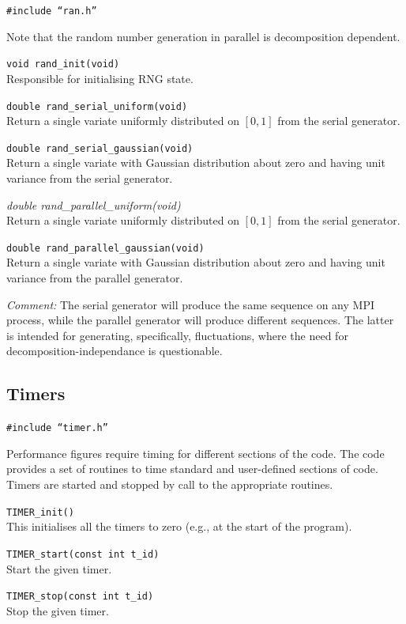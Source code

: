 \texttt{\#include ``ran.h''}

Note that the random number generation in parallel is
decomposition dependent.

\texttt{void rand\_init(void)}\\
Responsible for initialising RNG state.

\texttt{double rand\_serial\_uniform(void)}\\
Return a single variate uniformly distributed on $[0,1]$ from
the serial generator.

\texttt{double rand\_serial\_gaussian(void)}\\
Return a single variate with Gaussian distribution about zero
and having unit variance from the serial generator.

\textit{double rand\_parallel\_uniform(void)}\\
Return a single variate uniformly distributed on $[0,1]$
from the serial generator.

\texttt{double rand\_parallel\_gaussian(void)}\\
Return a single variate with Gaussian distribution about zero
and having unit variance from the parallel generator.

\textit{Comment:} The serial generator will produce the
same sequence on any MPI process, while the parallel generator
will produce different sequences. The latter is intended for
generating, specifically, fluctuations, where the need for
decomposition-independance is questionable.



\subsection{Timers}

\texttt{\#include ``timer.h''}

Performance figures require timing for different sections
of the code. The code provides a set of routines to time
standard and user-defined sections of code. Timers are
started and stopped by call to the appropriate routines.

\texttt{TIMER\_init()}\\
This initialises all the timers to zero (e.g., at the start of
the program).

\texttt{TIMER\_start(const int t\_id)}\\
Start the given timer.

\texttt{TIMER\_stop(const int t\_id)}\\
Stop the given timer.

